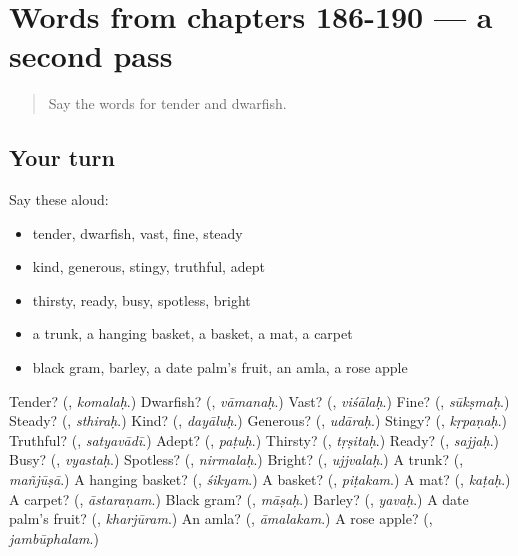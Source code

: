 \section[(dialogue)]{Words from chapters 186-190 — a second pass}

\label{lesson:SA-R190-second-pass-words-from-chapters-186-190}



\begin{quote}
Say the words for tender and dwarfish.
\end{quote}

\subsection*{Your turn}
Say these aloud:

\begin{itemize}
\raggedright
  \item tender, dwarfish, vast, fine, steady
  \item kind, generous, stingy, truthful, adept
  \item thirsty, ready, busy, spotless, bright
  \item a trunk, a hanging basket, a basket, a mat, a carpet
  \item black gram, barley, a date palm's fruit, an amla, a rose apple
\end{itemize}

\begin{tcolorbox}[breakable,colback=teal!4,colframe=teal!35!black,title={Before you move on}]
Tender? (\textbf{}, \emph{komalaḥ}.) Dwarfish? (\textbf{}, \emph{vāmanaḥ}.) Vast? (\textbf{}, \emph{viśālaḥ}.) Fine? (\textbf{}, \emph{sūkṣmaḥ}.) Steady? (\textbf{}, \emph{sthiraḥ}.) Kind? (\textbf{}, \emph{dayāluḥ}.) Generous? (\textbf{}, \emph{udāraḥ}.) Stingy? (\textbf{}, \emph{kṛpaṇaḥ}.) Truthful? (\textbf{}, \emph{satyavādī}.) Adept? (\textbf{}, \emph{paṭuḥ}.) Thirsty? (\textbf{}, \emph{tṛṣitaḥ}.) Ready? (\textbf{}, \emph{sajjaḥ}.) Busy? (\textbf{}, \emph{vyastaḥ}.) Spotless? (\textbf{}, \emph{nirmalaḥ}.) Bright? (\textbf{}, \emph{ujjvalaḥ}.) A trunk? (\textbf{}, \emph{mañjūṣā}.) A hanging basket? (\textbf{}, \emph{śikyam}.) A basket? (\textbf{}, \emph{piṭakam}.) A mat? (\textbf{}, \emph{kaṭaḥ}.) A carpet? (\textbf{}, \emph{āstaraṇam}.) Black gram? (\textbf{}, \emph{māṣaḥ}.) Barley? (\textbf{}, \emph{yavaḥ}.) A date palm's fruit? (\textbf{}, \emph{kharjūram}.) An amla? (\textbf{}, \emph{āmalakam}.) A rose apple? (\textbf{}, \emph{jambūphalam}.)
\end{tcolorbox}
